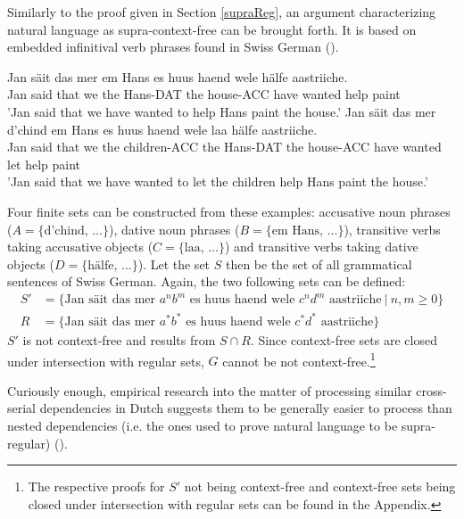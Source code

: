 Similarly to the proof given in Section \ref{supraReg}, an argument characterizing natural language as supra-context-free can be brought forth. It is based on embedded infinitival verb phrases found in Swiss German (\cite{Shieber1987}).
\begin{exe}
	\ex
	\gll Jan säit das mer em Hans es huus haend wele hälfe aastriiche. \\
	Jan said that we the Hans-DAT the house-ACC have wanted help paint \\
	\trans 'Jan said that we have wanted to help Hans paint the house.'
	\ex
	\gll Jan säit das mer d'chind em Hans es huus haend wele laa hälfe aastriiche. \\
	Jan said that we the children-ACC the Hans-DAT the house-ACC have wanted let help paint \\
	\trans 'Jan said that we have wanted to let the children help Hans paint the house.'
\end{exe}
Four finite sets can be constructed from these examples: accusative noun phrases ($A = \lbrace \text{d'chind}, \, \dots \rbrace$), dative noun phrases ($B = \lbrace \text{em Hans}, \, \dots \rbrace$), transitive verbs taking accusative objects ($C = \lbrace \text{laa}, \, \dots \rbrace$) and transitive verbs taking dative objects ($D = \lbrace \text{hälfe}, \, \dots \rbrace$). Let the set $S$ then be the set of all grammatical sentences of Swiss German. Again, the two following sets can be defined:
\begin{align*}
S' &= \lbrace \text{Jan säit das mer } a^{n}b^{m} \text{ es huus haend wele } c^{n}d^{m} \text{ aastriiche} \: \vert \: n, m \geq 0 \rbrace \\
R &= \lbrace \text{Jan säit das mer } a^{*}b^{*} \text{ es huus haend wele } c^{*}d^{*} \text{ aastriiche} \rbrace
\end{align*}
$S'$ is not context-free and results from $S \cap R$. Since context-free sets are closed under intersection with regular sets, $G$ cannot be not context-free.\footnote{The respective proofs for $S'$ not being context-free and context-free sets being closed under intersection with regular sets can be found in the Appendix.}

Curiously enough, empirical research into the matter of processing similar cross-serial dependencies in Dutch suggests them to be generally easier to process than nested dependencies (i.e. the ones used to prove natural language to be supra-regular) (\cite{Bach1986}).

